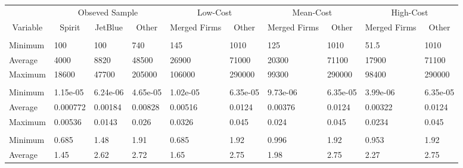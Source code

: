 
\begin{tabular}[t]{llllllllll}
\toprule
\multicolumn{1}{c}{ } & \multicolumn{3}{c}{Obseved Sample} & \multicolumn{2}{c}{Low-Cost} & \multicolumn{2}{c}{Mean-Cost} & \multicolumn{2}{c}{High-Cost} \\
\cmidrule(l{3pt}r{3pt}){2-4} \cmidrule(l{3pt}r{3pt}){5-6} \cmidrule(l{3pt}r{3pt}){7-8} \cmidrule(l{3pt}r{3pt}){9-10}
\multicolumn{1}{c}{Variable} & \multicolumn{1}{c}{Spirit} & \multicolumn{1}{c}{JetBlue} & \multicolumn{1}{c}{Other} & \multicolumn{1}{c}{Merged Firms} & \multicolumn{1}{c}{Other} & \multicolumn{1}{c}{Merged Firms} & \multicolumn{1}{c}{Other} & \multicolumn{1}{c}{Merged Firms} & \multicolumn{1}{c}{Other} \\
\cmidrule(l{3pt}r{3pt}){1-1} \cmidrule(l{3pt}r{3pt}){2-2} \cmidrule(l{3pt}r{3pt}){3-3} \cmidrule(l{3pt}r{3pt}){4-4} \cmidrule(l{3pt}r{3pt}){5-5} \cmidrule(l{3pt}r{3pt}){6-6} \cmidrule(l{3pt}r{3pt}){7-7} \cmidrule(l{3pt}r{3pt}){8-8} \cmidrule(l{3pt}r{3pt}){9-9} \cmidrule(l{3pt}r{3pt}){10-10}
\addlinespace[0.3em]
\multicolumn{10}{l}{\textbf{Passengers}}\\
\hspace{1em}Minimum & 100 & 100 & 740 & 145 & 1010 & 125 & 1010 & 51.5 & 1010\\
\hspace{1em}Average & 4000 & 8820 & 48500 & 26900 & 71000 & 20300 & 71100 & 17900 & 71100\\
\hspace{1em}Maximum & 18600 & 47700 & 205000 & 106000 & 290000 & 99300 & 290000 & 98400 & 290000\\
\addlinespace[0.3em]
\multicolumn{10}{l}{\textbf{Market Share}}\\
\hspace{1em}Minimum & 1.15e-05 & 6.24e-06 & 4.65e-05 & 1.02e-05 & 6.35e-05 & 9.73e-06 & 6.35e-05 & 3.99e-06 & 6.35e-05\\
\hspace{1em}Average & 0.000772 & 0.00184 & 0.00828 & 0.00516 & 0.0124 & 0.00376 & 0.0124 & 0.00322 & 0.0124\\
\hspace{1em}Maximum & 0.00536 & 0.0143 & 0.026 & 0.0326 & 0.045 & 0.024 & 0.045 & 0.0234 & 0.045\\
\addlinespace[0.3em]
\multicolumn{10}{l}{\textbf{Prices}}\\
\hspace{1em}Minimum & 0.685 & 1.48 & 1.91 & 0.685 & 1.92 & 0.996 & 1.92 & 0.953 & 1.92\\
\hspace{1em}Average & 1.45 & 2.62 & 2.72 & 1.65 & 2.75 & 1.98 & 2.75 & 2.27 & 2.75\\

\end{tabular}
